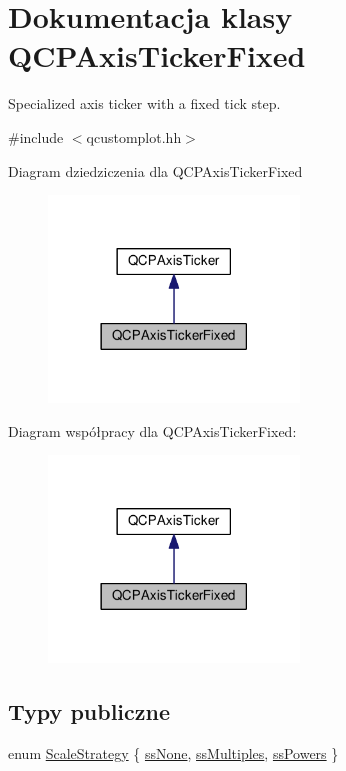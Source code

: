 \hypertarget{class_q_c_p_axis_ticker_fixed}{}\section{Dokumentacja klasy Q\+C\+P\+Axis\+Ticker\+Fixed}
\label{class_q_c_p_axis_ticker_fixed}


Specialized axis ticker with a fixed tick step.  




{\ttfamily \#include $<$qcustomplot.\+hh$>$}



Diagram dziedziczenia dla Q\+C\+P\+Axis\+Ticker\+Fixed\nopagebreak
\begin{figure}[H]
\begin{center}
\leavevmode
\includegraphics[width=189pt]{class_q_c_p_axis_ticker_fixed__inherit__graph}
\end{center}
\end{figure}


Diagram współpracy dla Q\+C\+P\+Axis\+Ticker\+Fixed\+:\nopagebreak
\begin{figure}[H]
\begin{center}
\leavevmode
\includegraphics[width=189pt]{class_q_c_p_axis_ticker_fixed__coll__graph}
\end{center}
\end{figure}
\subsection*{Typy publiczne}
\begin{DoxyCompactItemize}
\item 
enum \hyperlink{class_q_c_p_axis_ticker_fixed_a15b3d38b935d404b1311eb85cfb6a439}{Scale\+Strategy} \{ \hyperlink{class_q_c_p_axis_ticker_fixed_a15b3d38b935d404b1311eb85cfb6a439a6621275677a05caa0de204ae3956b85f}{ss\+None}, 
\hyperlink{class_q_c_p_axis_ticker_fixed_a15b3d38b935d404b1311eb85cfb6a439a22f651785f6412645837421896561104}{ss\+Multiples}, 
\hyperlink{class_q_c_p_axis_ticker_fixed_a15b3d38b935d404b1311eb85cfb6a439ac39d5813e9165ebd494307ae61ce5dce}{ss\+Powers}
 \}
\end{DoxyCompactItemize}
